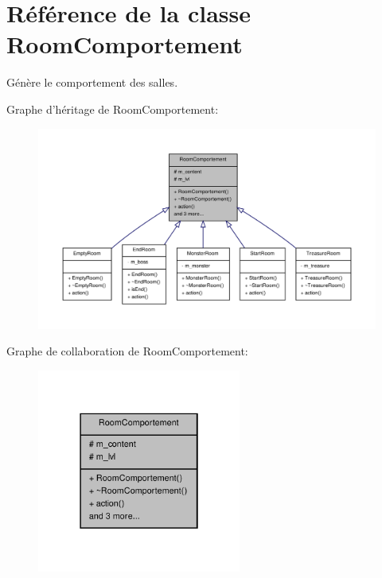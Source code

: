 \hypertarget{class_room_comportement}{\section{Référence de la classe Room\-Comportement}
\label{class_room_comportement}
}


Génère le comportement des salles.  




Graphe d'héritage de Room\-Comportement\-:
\nopagebreak
\begin{figure}[H]
\begin{center}
\leavevmode
\includegraphics[width=350pt]{class_room_comportement__inherit__graph}
\end{center}
\end{figure}


Graphe de collaboration de Room\-Comportement\-:
\nopagebreak
\begin{figure}[H]
\begin{center}
\leavevmode
\includegraphics[width=190pt]{class_room_comportement__coll__graph}
\end{center}
\end{figure}
